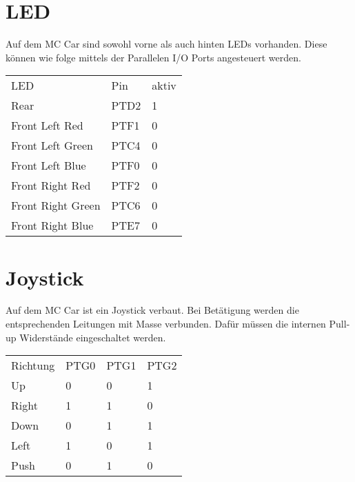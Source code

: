 \documentclass[a4paper,10pt,fleqn]{article}
\begin{document}
\section{LED}
Auf dem MC Car sind sowohl vorne als auch hinten LEDs vorhanden. Diese können 
wie folge mittels der Parallelen I/O Ports angesteuert werden. \\
\begin{table}[h!]
\begin{tabular}{lll}
\rowcolor{white} LED                 & Pin   & aktiv \\
\rowcolor{lgray} Rear                & PTD2  & 1     \\
\rowcolor{white} Front Left  Red     & PTF1  & 0     \\
\rowcolor{lgray} Front Left  Green   & PTC4  & 0     \\
\rowcolor{white} Front Left  Blue    & PTF0  & 0     \\
\rowcolor{lgray} Front Right Red     & PTF2  & 0     \\
\rowcolor{white} Front Right Green   & PTC6  & 0     \\
\rowcolor{lgray} Front Right Blue    & PTE7  & 0     \\
\end{tabular}
\end{table}

\section{Joystick}
Auf dem MC Car ist ein Joystick verbaut. Bei Betätigung werden die 
entsprechenden Leitungen mit Masse verbunden. Dafür müssen die internen 
Pull-up Widerstände eingeschaltet werden. 
\begin{table}[h!]
\begin{tabular}{llll}
\rowcolor{white} Richtung    & PTG0  & PTG1  & PTG2  \\
\rowcolor{lgray} Up          & 0     & 0     & 1     \\
\rowcolor{white} Right       & 1     & 1     & 0     \\
\rowcolor{lgray} Down        & 0     & 1     & 1     \\
\rowcolor{white} Left        & 1     & 0     & 1     \\
\rowcolor{lgray} Push        & 0     & 1     & 0     \\
\end{tabular}
\end{table}
\end{document}
